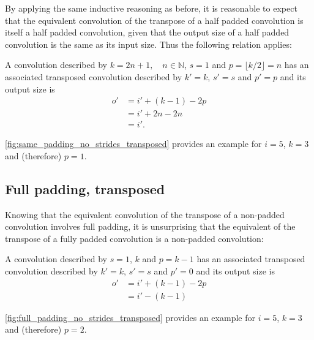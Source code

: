By applying the same inductive reasoning as before, it is reasonable to expect
that the equivalent convolution of the transpose of a half padded convolution
is itself a half padded convolution, given that the output size of a half
padded convolution is the same as its input size. Thus the following relation
applies:

\begin{relationship}\label{rel:half_padding_no_strides_transposed}
A convolution described by $k = 2n + 1, \quad n \in \mathbb{N}$, $s = 1$ and $p
= \lfloor k / 2 \rfloor = n$ has an associated transposed convolution described
by $k' = k$, $s' = s$ and $p' = p$ and its output size is
\begin{equation*}
\begin{split}
    o' &= i' + (k - 1) - 2p \\
       &= i' + 2n - 2n \\
       &= i'.
\end{split}
\end{equation*}
\end{relationship}

\autoref{fig:same_padding_no_strides_transposed} provides an example for $i =
5$, $k = 3$ and (therefore) $p = 1$.

\subsection{Full padding, transposed}

Knowing that the equivalent convolution of the transpose of a non-padded
convolution involves full padding, it is unsurprising that the equivalent of
the transpose of a fully padded convolution is a non-padded convolution:

\begin{relationship}\label{rel:full_padding_no_strides_transposed}
A convolution described by $s = 1$, $k$ and $p = k - 1$ has an
associated transposed convolution described by $k' = k$, $s' = s$ and $p' = 0$
and its output size is
\begin{equation*}
\begin{split}
    o' &= i' + (k - 1) - 2p \\
       &= i' - (k - 1)
\end{split}
\end{equation*}
\end{relationship}

\autoref{fig:full_padding_no_strides_transposed} provides an example for $i =
5$, $k = 3$ and (therefore) $p = 2$.

